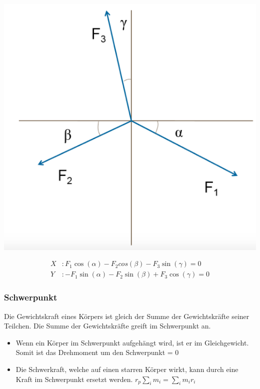 \documentclass[
a4paper,
oneside,
landscape, 
8pt,
]{scrartcl}
\begin{document}
\begin{multicols*}{2}
\begin{minipage}[h!]{0.5\linewidth}
	\includegraphics[width=0.7\linewidth]{images/gleichgewicht}
\end{minipage}
\hfill
\begin{minipage}[h!]{0.5\linewidth}
	
	\begin{align*}
	X &: F_1  \cos(\alpha) - F_2  cos(\beta) - F_3 \sin(\gamma) = 0 \\
	Y &: -F_1  \sin(\alpha) - F_2 \sin(\beta) + F_3 \cos(\gamma) = 0
	\end{align*}
	
\end{minipage}

\subsubsection{Schwerpunkt}
Die Gewichtskraft eines Körpers ist gleich der Summe der Gewichtskräfte seiner Teilchen. Die Summe der Gewichtskräfte greift im Schwerpunkt an. 
\begin{itemize}
	\item Wenn ein Körper im Schwerpunkt aufgehängt wird, ist er im Gleichgewicht. Somit ist das Drehmoment um den Schwerpunkt = 0
	\item Die Schwerkraft, welche auf einen starren Körper wirkt, kann durch eine Kraft im Schwerpunkt ersetzt werden. $r_p \sum_{i} m_i = \sum_{i} m_i  r_i$
\end{itemize}


\vfill\null
\columnbreak



\end{multicols*}
\end{document}
